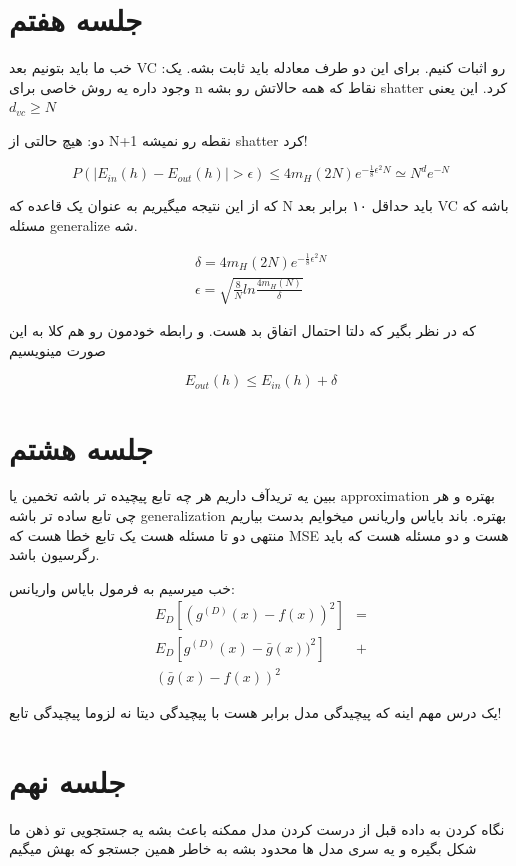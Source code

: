 \documentclass[twocolumn,11pt]{article}
\begin{document}
\section{جلسه هفتم}
خب ما باید بتونیم بعد VC
رو اثبات کنیم. برای این دو طرف معادله باید ثابت بشه. 
یک: وجود داره یه روش خاصی برای n نقاط که همه حالاتش رو بشه 
shatter کرد. 
این یعنی 
$d_{vc} \geq N$

دو: هیچ حالتی از N+1 نقطه رو نمیشه 
shatter کرد!

\begin{equation}
P(|E_{in}(h) - E_{out}(h)| > \epsilon) \leq
4 m_H(2N) e^{-\frac{1}{8} \epsilon^2 N} \simeq 
N^d e^{-N}
\end{equation}

که از این نتیجه میگیریم به عنوان یک قاعده که N
باید حداقل ۱۰ برابر بعد VC
باشه که مسئله 
generalize 
شه. 

\begin{gather}
\delta = 4 m_H(2N) e^{-\frac{1}{8} \epsilon^2 N} \\
\epsilon = \sqrt{\frac{8}{N} ln\frac{4m_H(N)}{\delta}}
\end{gather}

که در نظر بگیر که دلتا احتمال اتفاق بد هست. و رابطه خودمون رو هم کلا به این صورت مینویسیم

\begin{equation}
E_{out}(h) \leq E_{in}(h) + \delta
\end{equation}

\section{جلسه هشتم}
ببین یه تریدآف داریم هر چه تابع پیچیده تر باشه تخمین یا 
approximation
بهتره و هر چی تابع ساده تر باشه
generalization 
بهتره. باند بایاس واریانس میخوایم بدست بیاریم منتهی دو تا مسئله هست یک تابع خطا هست 
که MSE هست و دو مسئله هست که باید رگرسیون باشد. 

خب میرسیم به فرمول بایاس واریانس:
\begin{equation}
\begin{split}
E_D[(g^{(D)}(x) - f(x))^2] &= \\
E_D[g^{(D)}(x) - \bar{g}(x))^2] &+\\ (\bar{g}(x)- f(x))^2
\end{split}
\end{equation}

یک درس مهم اینه که پیچیدگی مدل برابر هست با پیچیدگی دیتا نه لزوما پیچیدگی تابع! 

\section{جلسه نهم}
نگاه کردن به داده قبل از درست کردن مدل ممکنه باعث بشه یه جستجویی تو ذهن ما شکل بگیره و یه سری مدل ها محدود بشه به خاطر همین جستجو که بهش میگیم
\end{document}
